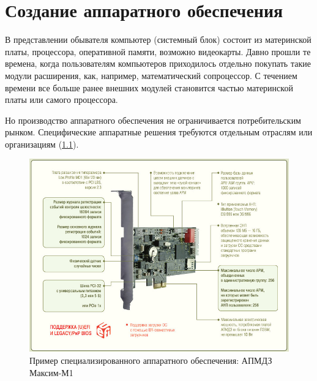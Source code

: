 \chapter{Создание аппаратного обеспечения}\label{ch:ch1}

В представлении обывателя компьютер (системный блок) состоит из материнской платы,
процессора, оперативной памяти, возможно видеокарты.
Давно прошли те времена, когда пользователям компьютеров приходилось отдельно покупать такие модули расширения,
как, например, математический сопроцессор.
С течением времени все больше ранее внешних модулей становится частью материнской платы или самого процессора.

Но производство аппаратного обеспечения не ограничивается потребительским рынком.
Специфические аппаратные решения требуются отдельным отраслям или организациям (\cref{fig:apmdz}).

\begin{figure}[!htbp]
    \includegraphics[width=\textwidth,height=\textheight,keepaspectratio]{images/apmdz.png}
    \caption{Пример специализированного аппаратного обеспечения: АПМДЗ Максим-М1 \cite{maksim} \label{fig:apmdz}}
\end{figure}


